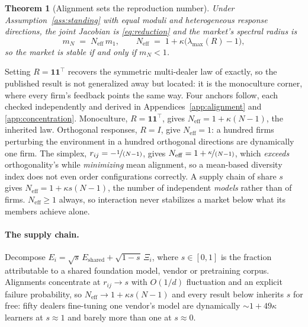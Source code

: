 \documentclass{article}
\theoremstyle{plain}
\newtheorem{theorem}{Theorem}
\theoremstyle{definition}
\newcommand{\Neff}{N_{\mathrm{eff}}}
\newcommand{\mN}{m_N}
\newcommand{\lmax}{\lambda_{\max}}
\begin{document}
\begin{theorem}[Alignment sets the reproduction number]
\label{thm:alignment}
Under Assumption~\ref{ass:standing} with equal moduli and heterogeneous response directions, the joint Jacobian is \eqref{eq:reduction} and the market's spectral radius is
\begin{equation}
\mN \;=\; \Neff\, m_1, \qquad \Neff \;=\; 1 + \kappa\bigl(\lmax(R) - 1\bigr),
\end{equation}
so the market is stable if and only if $\mN < 1$.
\end{theorem}

Setting $R = \mathbf{1}\mathbf{1}^{\top}$ recovers the symmetric multi-dealer law of \citet{reflex2026} exactly, so the published result is not generalized away but located: it is the monoculture corner, where every firm's feedback points the same way. Four anchors follow, each checked independently and derived in Appendices~\ref{app:alignment} and \ref{app:concentration}. Monoculture, $R=\mathbf{1}\mathbf{1}^{\top}$, gives $\Neff = 1+\kappa(N-1)$, the inherited law. Orthogonal responses, $R=I$, give $\Neff = 1$: a hundred firms perturbing the environment in a hundred orthogonal directions are dynamically one firm. The simplex, $r_{ij} = -\nicefrac{1}{(N-1)}$, gives $\Neff = 1+\nicefrac{\kappa}{(N-1)}$, which \emph{exceeds} orthogonality's while \emph{minimizing} mean alignment, so a mean-based diversity index does not even order configurations correctly. A supply chain of share $s$ gives $\Neff = 1+\kappa s(N-1)$, the number of independent \emph{models} rather than of firms. $\Neff \geq 1$ always, so interaction never stabilizes a market below what its members achieve alone.

\paragraph{The supply chain.}
Decompose $E_i = \sqrt{s}\,E_{\text{shared}} + \sqrt{1-s}\,\Xi_i$, where $s\in[0,1]$ is the fraction attributable to a shared foundation model, vendor or pretraining corpus. Alignments concentrate at $r_{ij}\to s$ with $O(1/d)$ fluctuation and an explicit failure probability, so $\Neff \to 1 + \kappa s (N-1)$ and every result below inherits $s$ for free: fifty dealers fine-tuning one vendor's model are dynamically ${\sim}1+49\kappa$ learners at $s\approx 1$ and barely more than one at $s \approx 0$.
\end{document}
